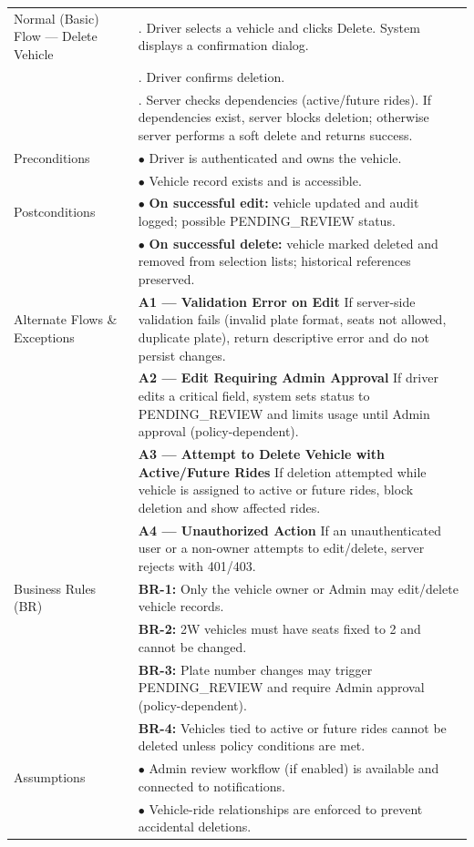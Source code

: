 \begin{longtable}{|>{\raggedright\arraybackslash}p{4cm}|>{\raggedright\arraybackslash}p{11cm}|}
\hline
Normal (Basic) Flow --- Delete Vehicle & 1. Driver selects a vehicle and clicks Delete. System displays a confirmation dialog. \\
& 2. Driver confirms deletion. \\
& 3. Server checks dependencies (active/future rides). If dependencies exist, server blocks deletion; otherwise server performs a soft delete and returns success. \\
\hline
Preconditions & $\bullet$ Driver is authenticated and owns the vehicle. \\
& $\bullet$ Vehicle record exists and is accessible. \\
\hline
Postconditions & $\bullet$ \textbf{On successful edit:} vehicle updated and audit logged; possible PENDING\_REVIEW status. \\
& $\bullet$ \textbf{On successful delete:} vehicle marked deleted and removed from selection lists; historical references preserved. \\
\hline
Alternate Flows \& Exceptions & \textbf{A1 --- Validation Error on Edit} \newline If server-side validation fails (invalid plate format, seats not allowed, duplicate plate), return descriptive error and do not persist changes. \\
& \textbf{A2 --- Edit Requiring Admin Approval} \newline If driver edits a critical field, system sets status to PENDING\_REVIEW and limits usage until Admin approval (policy-dependent). \\
& \textbf{A3 --- Attempt to Delete Vehicle with Active/Future Rides} \newline If deletion attempted while vehicle is assigned to active or future rides, block deletion and show affected rides. \\
& \textbf{A4 --- Unauthorized Action} \newline If an unauthenticated user or a non-owner attempts to edit/delete, server rejects with 401/403. \\
\hline
Business Rules (BR) & \textbf{BR-1:} Only the vehicle owner or Admin may edit/delete vehicle records. \\
& \textbf{BR-2:} 2W vehicles must have seats fixed to 2 and cannot be changed. \\
& \textbf{BR-3:} Plate number changes may trigger PENDING\_REVIEW and require Admin approval (policy-dependent). \\
& \textbf{BR-4:} Vehicles tied to active or future rides cannot be deleted unless policy conditions are met. \\
\hline
Assumptions & $\bullet$ Admin review workflow (if enabled) is available and connected to notifications. \\
& $\bullet$ Vehicle-ride relationships are enforced to prevent accidental deletions. \\
\end{longtable}

